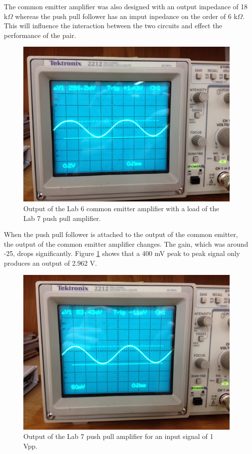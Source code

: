 \documentclass[12pt,letterpaper]{report}
\newlength \figwidth
\begin{document}
The common emitter amplifier was also designed with an output impedance of 18 k$\Omega$ whereas the push pull follower has an imput inpedance on the order of 6 k$\Omega$. This will influence the interaction between the two circuits and effect the performance of the pair.

\begin{figure}[H]
\centering
\includegraphics[width=\figwidth, keepaspectratio=true]{lab7_images/coupled_CE_output.jpg}
\caption{Output of the Lab 6 common emitter amplifier with a load of the Lab 7 push pull amplifier.}
\label{fig:ce_out_load}
\end{figure}

When the push pull follower is attached to the output of the common emitter, the output of the common emitter amplifier changes. The gain, which was around -25, drops significantly. Figure \ref{fig:ce_out_load} shows that a 400 mV peak to peak signal only produces an output of 2.962 V.

\begin{figure}[H]
\centering
\includegraphics[width=\figwidth, keepaspectratio=true]{lab7_images/pushpull_only_output.jpg}
\caption{Output of the Lab 7 push pull amplifier for an input signal of 1 Vpp.}
\label{fig:pp_out}
\end{figure}
\end{document}
